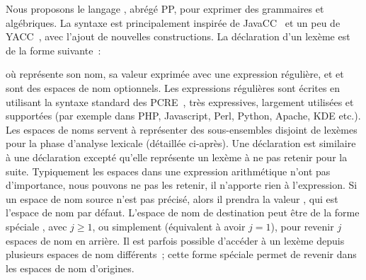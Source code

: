Nous proposons le langage , abrégé PP, pour exprimer des
grammaires  et algébriques. La syntaxe est principalement
inspirée de JavaCC~ et un peu de YACC~, avec
l'ajout de nouvelles constructions. La déclaration d'un lexème est de la forme
suivante~:
%
\begin{pre}
\end{pre}
%
où  représente son nom,  sa valeur exprimée avec une
expression régulière, et  et  sont des espaces
de nom optionnels. Les expressions régulières sont écrites en utilisant la
syntaxe standard des PCRE~, très expressives, largement utilisées
et supportées (par exemple dans PHP, Javascript, Perl, Python, Apache, KDE
etc.). Les espaces de noms servent à représenter des sous-ensembles disjoint de
lexèmes pour la phase d'analyse lexicale (détaillée ci-après). Une déclaration
 est similaire à une déclaration  excepté qu'elle
représente un lexème à ne pas retenir pour la suite. Typiquement les espaces
dans une expression arithmétique n'ont pas d'importance, nous pouvons ne pas les
retenir, il n'apporte rien à l'expression. Si un espace de nom source n'est pas
précisé, alors il prendra la valeur , qui est l'espace de nom par
défaut. L'espace de nom de destination peut être de la forme spéciale
, avec $j \geq 1$, ou simplement 
(équivalent à avoir $j = 1$), pour revenir $j$ espaces de nom en arrière. Il est
parfois possible d'accéder à un lexème depuis plusieurs espaces de nom
différents~; cette forme spéciale permet de revenir dans les espaces de nom
d'origines. \\

